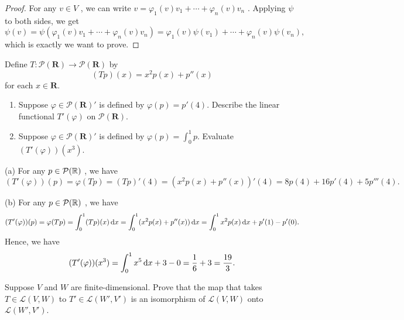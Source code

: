 \documentclass{article}
\begin{document}
\begin{proof}
	For any \( v\in V \) , we can write \( v=\varphi_1(v)v_1+\cdots+\varphi_n(v)v_n \) . Applying \( \psi \) to both sides, we get
	\[ \psi(v) = \psi(\varphi_1(v)v_1+\cdots+\varphi_n(v)v_n) = \varphi_1(v)\psi(v_1)+\cdots+\varphi_n(v)\psi(v_n), \] 
	which is exactly we want to prove.
\end{proof}

\begin{problem}[3F-15]
	Define $T : \mathcal{P}(\mathbf{R}) \to \mathcal{P}(\mathbf{R})$ by
	\[
		(Tp)(x) = x^2p(x) + p''(x)
	\]
	for each $x \in \mathbf{R}$.
	\begin{enumerate}[label=(\alph*)]
		\item Suppose $\varphi \in \mathcal{P}(\mathbf{R})'$ is defined by
		      $\varphi(p) = p'(4)$. Describe the linear functional
		      $T'(\varphi)$ on $\mathcal{P}(\mathbf{R})$.
		\item Suppose $\varphi \in \mathcal{P}(\mathbf{R})'$ is defined by
		      $\varphi(p) = \int_0^1 p$. Evaluate $(T'(\varphi))(x^3)$.
	\end{enumerate}
\end{problem}

\begin{solution}
	(a) For any \( p\in \mathcal{P}(\mathbb{R}) \) , we have
	\[ (T'(\varphi))(p)=\varphi(Tp)=(Tp)'(4)=(x^2p(x)+p''(x))'(4)=8p(4)+16p'(4)+5p'''(4). \] \par
	(b) For any \( p\in \mathcal{P}(\mathbb{R}) \) , we have
	\[ (T'(\varphi))(p)=\varphi(Tp)=\int_0^1 (Tp)(x)\,\mathrm{d} x=\int_0^1 (x^2p(x)+p''(x))\,\mathrm{d} x=\int_0^1 x^2p(x)\,\mathrm{d} x+p'(1)-p'(0). \] 
	Hence, we have
	\[ (T'(\varphi))(x^3)=\int_0^1 x^5\,\mathrm{d} x+3-0=\frac{1}{6}+3=\frac{19}{3}. \]
\end{solution}

\begin{problem}[3F-18]
	Suppose $V$ and $W$ are finite-dimensional. Prove that the map that takes
	$T \in \mathcal{L}(V, W)$ to $T' \in \mathcal{L}(W', V')$ is an isomorphism
	of $\mathcal{L}(V, W)$ onto $\mathcal{L}(W', V')$.
\end{problem}
\end{document}

